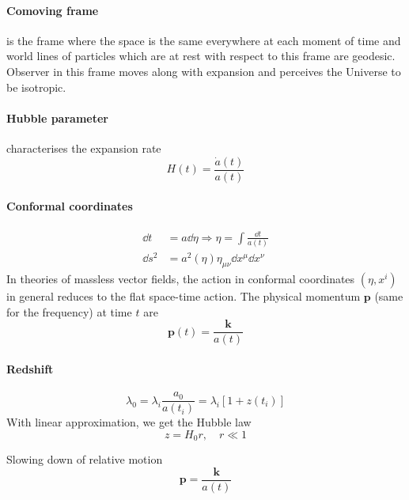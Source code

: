 \documentclass[12pt, a4paper, DIV=15]{article}
\numberwithin{equation}{section}
\begin{document}
\paragraph{Comoving frame} is the frame where the space is the same everywhere at each moment of time and world lines of particles which are at rest with respect to this frame are geodesic. Observer in this frame moves along with expansion and perceives the Universe to be isotropic. 

\paragraph{Hubble parameter} characterises the expansion rate
\begin{equation}
   H(t) = \frac{\dot a(t)}{a(t)}
\end{equation}

\paragraph{Conformal coordinates}
\begin{align}
   \dd{t} &= a \dd{\eta} \Rightarrow \eta = \int \frac{\dd{t}}{a(t)}\\
   \dd{s^2} &= a^2(\eta) \eta_{\mu\nu} \dd{x^\mu} \dd{x^\nu}
\end{align}
In theories of massless vector fields, the action in conformal coordinates $(\eta, x^i)$ in general reduces to the flat space-time action. The physical momentum $\pmb{p}$ (same for the frequency) at time $t$ are
\begin{equation}
   \pmb{p} (t) = \frac{\pmb{k}}{a(t)}
\end{equation}

\paragraph{Redshift}
\begin{equation}
   \lambda_0 = \lambda_i \frac{a_0}{a(t_i)} = \lambda_i \left[  1 + z(t_i) \right]
\end{equation}
With linear approximation, we get the Hubble law
\begin{equation}
   z = H_0 r, \quad r \ll 1
\end{equation}

Slowing down of relative motion
\begin{equation}
   \pmb{p} = \frac{\pmb{k}}{a(t)}
\end{equation}
\end{document}
